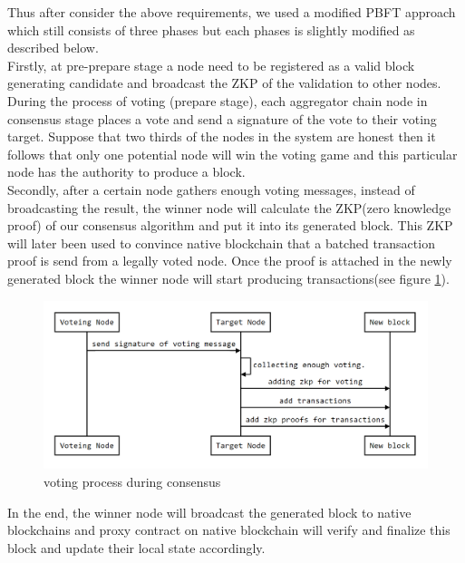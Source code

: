 \documentclass[pageno]{jpaper}
\begin{document}
Thus after consider the above requirements, we used a modified PBFT approach which still consists of three phases but each phases is slightly modified as described below.\\
\newline
Firstly, at pre-prepare stage a node need to be registered as a valid block generating candidate and broadcast the ZKP of the validation to other nodes. During the process of voting (prepare stage), each aggregator chain node in consensus stage places a vote and send a signature of the vote to their voting target. Suppose that two thirds of the nodes in the system are honest then it follows that only one potential node will win the voting game and this particular node has the authority to produce a block.\\
\newline
Secondly, after a certain node gathers enough voting messages, instead of broadcasting the result, the winner node will calculate the ZKP(zero knowledge proof) of our consensus algorithm and put it into its generated block. This ZKP will later been used to convince native blockchain that a batched transaction proof is send from a legally voted node. Once the proof is attached in the newly generated block the winner node will start producing transactions(see figure \ref{vote-sequence}).

\begin{figure}[!ht]
\includegraphics[scale=0.4]{vote-sequence.png}
\caption{voting process during consensus}
\label{vote-sequence}
\end{figure}

In the end, the winner node will broadcast the generated block to native blockchains and \dprotocol proxy contract on native blockchain will verify and finalize this block and update their local state accordingly.
\end{document}
